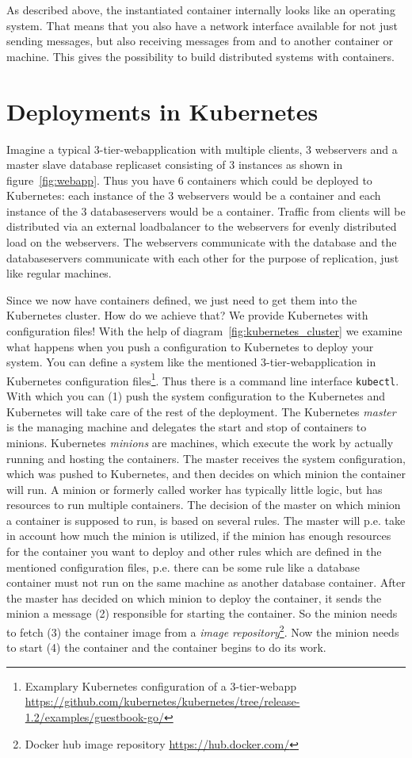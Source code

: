 \documentclass[runningheads,a4paper]{llncs}
\begin{document}
As described above, the instantiated container internally looks like an operating system. That means that you also have a network interface available for not just sending messages, but also receiving messages from and to another container or machine. This gives the possibility to build distributed systems with containers.

\section{Deployments in Kubernetes}

Imagine a typical 3-tier-webapplication with multiple clients, 3 webservers and a master slave database replicaset consisting of 3 instances as shown in figure~\ref{fig:webapp}. Thus you have 6 containers which could be deployed to Kubernetes: each instance of the 3 webservers would be a container and each instance of the 3 databaseservers would be a container. Traffic from clients will be distributed via an external loadbalancer to the webservers for evenly distributed load on the webservers. The webservers communicate with the database and the databaseservers communicate with each other for the purpose of replication, just like regular machines.

Since we now have containers defined, we just need to get them into the Kubernetes cluster. How do we achieve that? We provide Kubernetes with configuration files! With the help of diagram~\ref{fig:kubernetes_cluster} we examine what happens when you push a configuration to Kubernetes to deploy your system. You can define a system like the mentioned 3-tier-webapplication in Kubernetes configuration files\footnote{Examplary Kubernetes configuration of a 3-tier-webapp \url{https://github.com/kubernetes/kubernetes/tree/release-1.2/examples/guestbook-go/}}. Thus there is a command line interface \texttt{kubectl}. With which you can (1) push the system configuration to the Kubernetes and Kubernetes will take care of the rest of the deployment. The Kubernetes \emph{master} is the managing machine and delegates the start and stop of containers to minions. Kubernetes \emph{minions} are machines, which execute the work by actually running and hosting the containers. The master receives the system configuration, which was pushed to Kubernetes, and then decides on which minion the container will run. A minion or formerly called worker has typically little logic, but has resources to run multiple containers. The decision of the master on which minion a container is supposed to run, is based on several rules. The master will p.e. take in account how much the minion is utilized, if the minion has enough resources for the container you want to deploy and other rules which are defined in the mentioned configuration files, p.e. there can be some rule like a database container must not run on the same machine as another database container. After the master has decided on which minion to deploy the container, it sends the minion a message (2) responsible for starting the container. So the minion needs to fetch (3) the container image from a \emph{image repository}\footnote{Docker hub image repository \url{https://hub.docker.com/}}. Now the minion needs to start (4) the container and the container begins to do its work.
\end{document}
